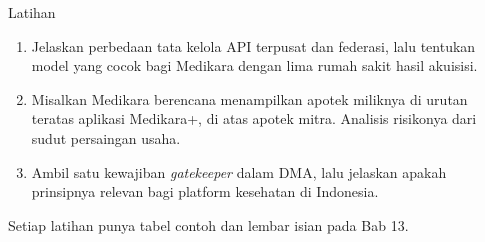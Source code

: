 \documentclass[aspectratio=169, table, 12pt]{beamer}
\begin{document}
\begin{frame}{{\Large Latihan}}
  \vspace{8pt}
  \begin{enumerate}
    \item Jelaskan perbedaan tata kelola API terpusat dan federasi, lalu tentukan model yang cocok bagi Medikara dengan lima rumah sakit hasil akuisisi.
    \item Misalkan Medikara berencana menampilkan apotek miliknya di urutan teratas aplikasi Medikara+, di atas apotek mitra. Analisis risikonya dari sudut persaingan usaha.
    \item Ambil satu kewajiban \textit{gatekeeper} dalam DMA, lalu jelaskan apakah prinsipnya relevan bagi platform kesehatan di Indonesia.
  \end{enumerate}
  \vspace{6pt}
  {\small Setiap latihan punya tabel contoh dan lembar isian pada Bab 13.}
\end{frame}
\end{document}
